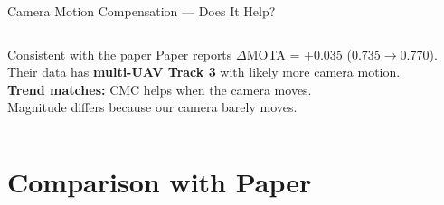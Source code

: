 \documentclass[aspectratio=169, 10pt]{beamer}
\begin{document}
\begin{frame}{Camera Motion Compensation — Does It Help?}
\begin{columns}[T]
    \vspace{0.5em}
    \begin{block}{Consistent with the paper}
      Paper reports $\Delta$MOTA = +0.035 (0.735$\to$0.770).\\
      Their data has \textbf{multi-UAV Track 3} with likely more camera motion.\\

      \vspace{0.3em}
      \textbf{Trend matches:} CMC helps when the camera moves.\\
      Magnitude differs because our camera barely moves.
    \end{block}

  \end{columns}
\end{frame}

\section{Comparison with Paper}
\end{document}
